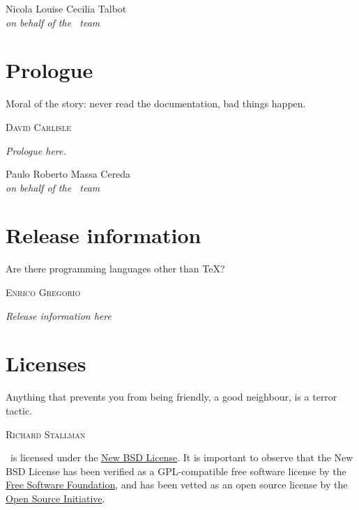 \documentclass[a4paper,twoside,12pt]{memoir}
\begin{document}
\vfill

\begin{flushright}
Nicola Louise Cecilia Talbot\\
\emph{on behalf of the \arara\ team}
\end{flushright}

\chapter*{Prologue}
\label{chap:prologue}

\epigraph{Moral of the story: never read the documentation, bad things happen.}{\textsc{David Carlisle}}

\emph{Prologue here.}

\vfill

\begin{flushright}
Paulo Roberto Massa Cereda\\
\emph{on behalf of the \arara\ team}
\end{flushright}

\chapter*{Release information}
\label{chap:releaseinformation}

\epigraph{Are there programming languages other than \TeX?}{\textsc{Enrico Gregorio}}

\emph{Release information here}

\chapter*{Licenses}
\label{chap:licenses}

\epigraph{Anything that prevents you from being friendly, a good neighbour, is a terror tactic.}{\textsc{Richard Stallman}}

\arara\ is licensed under the \href{http://www.opensource.org/licenses/bsd-license.php}{New BSD License}. It is important to observe that the New BSD License has been verified as a GPL-compatible free software license by the \href{http://www.fsf.org/}{Free Software Foundation}, and has been vetted as an open source license by the \href{http://www.opensource.org/}{Open Source Initiative}.
\end{document}
